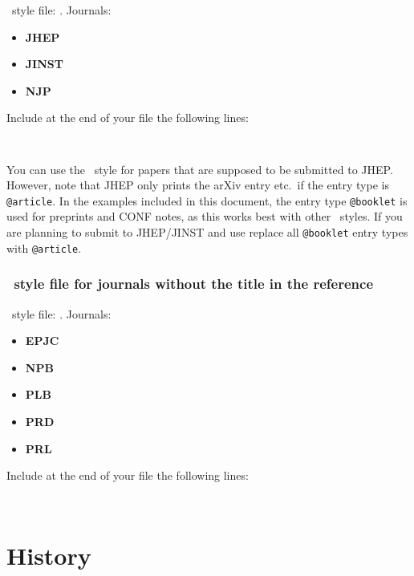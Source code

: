 \documentclass[UKenglish, texlive=2016]{\ATLASLATEXPATH atlasdoc}
\begin{document}
\BibTeX\ style file: .
Journals:
\begin{itemize}\setlength{\parskip}{0pt}\setlength{\itemsep}{0pt}
\item \textbf{JHEP}
\item \textbf{JINST}
\item \textbf{NJP}
\end{itemize}
\noindent Include at the end of your  file the following lines:
\begin{verbatim}


\end{verbatim}

You can use the \BibTeX\ style  for papers that are supposed to be submitted to JHEP.
However, note that JHEP only prints the arXiv entry etc.\ if the entry type is \texttt{@article}.
In the examples included in this document,
the entry type \texttt{@booklet} is used for preprints and CONF notes,
as this works best with other \BibTeX\ styles.
If you are planning to submit to JHEP/JINST and use 
replace all \texttt{@booklet} entry types with \texttt{@article}.


\subsubsection{\BibTeX\ style file for journals without the title in the reference}

\BibTeX\ style file: .
Journals:
\begin{itemize}\setlength{\parskip}{0pt}\setlength{\itemsep}{0pt}
\item \textbf{EPJC}
\item \textbf{NPB}
\item \textbf{PLB}
\item \textbf{PRD}
\item \textbf{PRL}
\end{itemize}
\noindent Include at the end of your  file the following lines:
\begin{verbatim}


\end{verbatim}

\section*{History}
\end{document}
